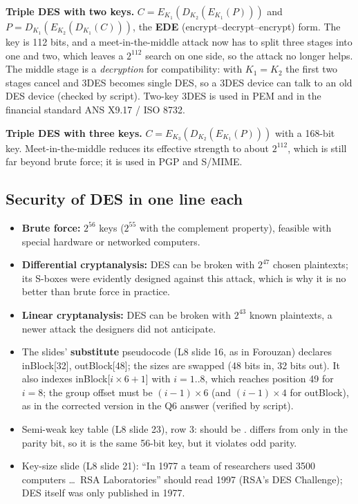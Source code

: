 \textbf{Triple DES with two keys.} $C = E_{K_1}(D_{K_2}(E_{K_1}(P)))$ and $P = D_{K_1}(E_{K_2}(D_{K_1}(C)))$, the \textbf{EDE} (encrypt--decrypt--encrypt) form. The key is 112 bits, and a meet-in-the-middle attack now has to split three stages into one and two, which leaves a $2^{112}$ search on one side, so the attack no longer helps. The middle stage is a \emph{decryption} for compatibility: with $K_1 = K_2$ the first two stages cancel and 3DES becomes single DES, so a 3DES device can talk to an old DES device (checked by script). Two-key 3DES is used in PEM and in the financial standard ANS X9.17 / ISO 8732.

\textbf{Triple DES with three keys.} $C = E_{K_3}(D_{K_2}(E_{K_1}(P)))$ with a 168-bit key. Meet-in-the-middle reduces its effective strength to about $2^{112}$, which is still far beyond brute force; it is used in PGP and S/MIME.

\subsection{Security of DES in one line each}
\begin{itemize}
  \item \textbf{Brute force:} $2^{56}$ keys ($2^{55}$ with the complement property), feasible with special hardware or networked computers.
  \item \textbf{Differential cryptanalysis:} DES can be broken with $2^{47}$ chosen plaintexts; its S-boxes were evidently designed against this attack, which is why it is no better than brute force in practice.
  \item \textbf{Linear cryptanalysis:} DES can be broken with $2^{43}$ known plaintexts, a newer attack the designers did not anticipate.
\end{itemize}

\begin{fixbox}
\begin{itemize}
  \item The slides' \textbf{substitute} pseudocode (L8 slide 16, as in Forouzan) declares inBlock[32], outBlock[48]; the sizes are swapped (48 bits in, 32 bits out). It also indexes inBlock[$i \times 6 + 1$] with $i = 1..8$, which reaches position 49 for $i = 8$; the group offset must be $(i - 1) \times 6$ (and $(i - 1) \times 4$ for outBlock), as in the corrected version in the Q6 answer (verified by script).
  \item Semi-weak key table (L8 slide 23), row 3:  should be .  differs from  only in the parity bit, so it is the same 56-bit key, but it violates odd parity.
  \item Key-size slide (L8 slide 21): ``In 1977 a team of researchers used 3500 computers \dots\ RSA Laboratories'' should read 1997 (RSA's DES Challenge); DES itself was only published in 1977.
\end{itemize}
\end{fixbox}
